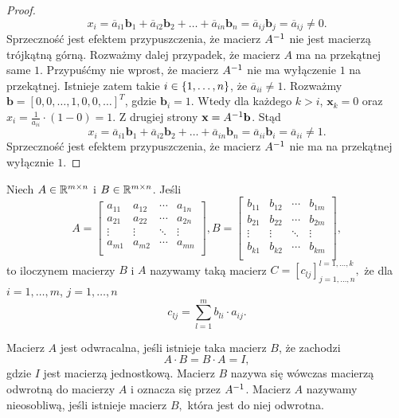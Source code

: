 \documentclass[12pt,a4paper]{report}
\newcommand{\vr}[1]{\mathbf{#1}}
\newcommand{\mx}[1]{{#1}}
\begin{document}
\begin{proof}
$$
x_{i} = \overline{a}_{i1} \vr{b}_{1} + \overline{a}_{i2} \vr{b}_{2} + \ldots + \overline{a}_{in} \vr{b}_{n} = \overline{a}_{ij} \vr{b}_{j} = \overline{a}_{ij} \neq 0.
$$ 
Sprzeczność jest efektem przypuszczenia, że macierz $\inverse{\mx{A}}$ nie jest macierzą trójkątną górną.
Rozważmy dalej przypadek, że macierz $\mx{A}$ ma na przekątnej same $1$. Przypuśćmy nie wprost, że macierz $\inverse{\mx{A}}$ nie ma wyłączenie $1$ na przekątnej. Istnieje zatem takie $ i \in \left\lbrace {1, \ldots, n} \right\rbrace$, że $\overline{a}_{ii} \neq 1$. Rozważmy $\vr{b} = [0,0, \ldots, 1,0,0, \ldots]^{T}$, gdzie $\vr{b}_{i} = 1$. Wtedy dla każdego $k>i$, $\vr{x}_{k} = 0$ oraz $x_{i} = \frac{1}{a_{ii}} \cdot(1 - 0 ) = 1$. Z drugiej strony $\vr{x} = \inverse{\mx{A}} \vr{b}$. Stąd 
$$
x_{i} = \overline{a}_{i1} \vr{b}_{1} + \overline{a}_{i2} \vr{b}_{2} + \ldots + \overline{a}_{in} \vr{b}_{n} = \overline{a}_{ii} \vr{b}_{i} = \overline{a}_{ii} \neq 1.
$$
Sprzeczność jest efektem przypuszczenia, że macierz $\inverse{\mx{A}}$ nie ma na przekątnej wyłącznie $1$.

\end{proof}


\begin{definition}
Niech $\mx{A}\in \setR^{m \times n }$ i $\mx{B}\in \setR^{m \times n }$. Jeśli
$$
\mx{A} = \begin{bmatrix}
 a_{11} & a_{12} & \cdots & a_{1n} \\
         a_{21} & a_{22} & \cdots & a_{2n} \\
         \vdots & \vdots & \ddots & \vdots \\
         a_{m1} & a_{m2} & \cdots & a_{mn} \\
\end{bmatrix}, \mx{B} = \begin{bmatrix}
 b_{11} & b_{12} & \cdots & b_{1m} \\
         b_{21} & b_{22} & \cdots & b_{2m} \\
         \vdots & \vdots & \ddots & \vdots \\
         b_{k1} & b_{k2} & \cdots & b_{km} \\
\end{bmatrix},
$$ 
to iloczynem macierzy $\mx{B}$ i $\mx{A}$ nazywamy taką macierz $\mx{C} = [c_{lj}]_{j=1,\ldots,n}^{l=1,\ldots,k},$ że dla $i=1,\ldots,m$, $j=1,\ldots,n $
$$
c_{lj}= \sum_{l=1}^{m} b_{li} \cdot a_{ij}.
$$
\end{definition}


\begin{definition} 
Macierz $\mx{A}$ jest odwracalna, jeśli istnieje taka macierz $\mx{B}$, że zachodzi
$$
\mx{A}\cdot \mx{B}=\mx{B}\cdot \mx{A}=\mx{I},
$$ 
gdzie $\mx{I}$ jest macierzą jednostkową. Macierz $\mx{B}$ nazywa się wówczas macierzą odwrotną do macierzy $\mx{A}$ i oznacza się przez  $\inverse{\mx{A}}$. Macierz $\mx{A}$ nazywamy nieosobliwą, jeśli istnieje macierz $\mx{B},$ która jest do niej odwrotna.

\end{definition}
\end{document}
